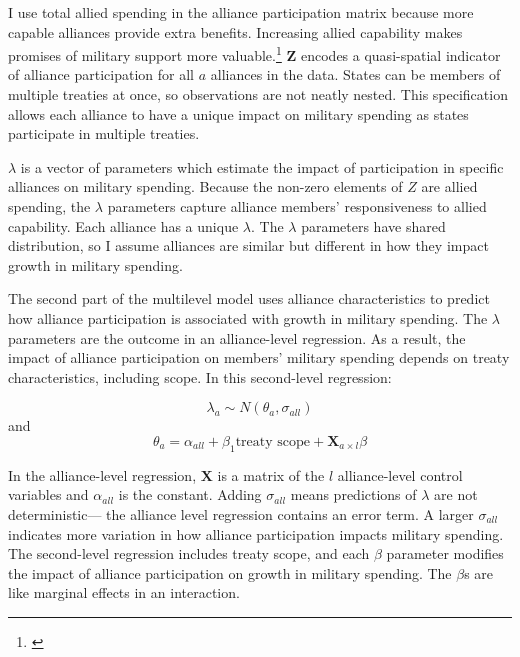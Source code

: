 \documentclass[12pt]{article}
\begin{document}
I use total allied spending in the alliance participation matrix because more capable alliances provide extra benefits.
Increasing allied capability makes promises of military support more valuable.\footnote{\cite{Johnsonetal2015}} 
$\textbf{Z}$ encodes a quasi-spatial indicator of alliance participation for all $a$ alliances in the data. 
States can be members of multiple treaties at once, so observations are not neatly nested. 
This specification allows each alliance to have a unique impact on military spending as states participate in multiple treaties. 


$\lambda$ is a vector of parameters which estimate the impact of participation in specific alliances on military spending. 
Because the non-zero elements of $Z$ are allied spending, the $\lambda$ parameters capture alliance members' responsiveness to allied capability. 
Each alliance has a unique $\lambda$. 
The $\lambda$ parameters have shared distribution, so I assume alliances are similar but different in how they impact growth in military spending. 


The second part of the multilevel model uses alliance characteristics to predict how alliance participation is associated with growth in military spending. 
The $\lambda$ parameters are the outcome in an alliance-level regression.
As a result, the impact of alliance participation on members' military spending depends on treaty characteristics, including scope. 
In this second-level regression: 


\begin{equation}
\lambda_{a} \sim N(\theta_{a}, \sigma_{all})
\end{equation} 
and 
\begin{equation}
\theta_{a} = \alpha_{all} + \beta_1 \mbox{treaty scope} + \textbf{X}_{a \times l} \beta
\end{equation}


In the alliance-level regression, $\textbf{X}$ is a matrix of the $l$ alliance-level control variables and $\alpha_{all}$ is the constant.
Adding $\sigma_{all}$ means predictions of $\lambda$ are not deterministic--- the alliance level regression contains an error term. 
A larger $\sigma_{all}$ indicates more variation in how alliance participation impacts military spending. 
The second-level regression includes treaty scope, and each $\beta$ parameter modifies the impact of alliance participation on growth in military spending. 
The $\beta$s are like marginal effects in an interaction. 
\end{document}

